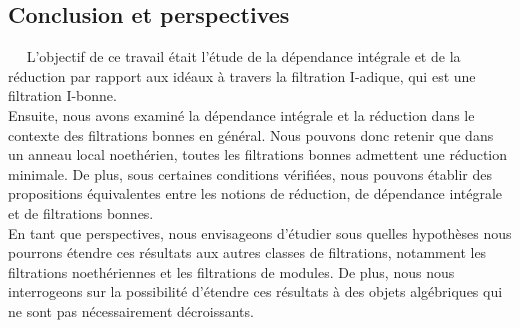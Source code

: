 \begin{center}
	\chapter*{Conclusion et perspectives}
\end{center}

$ \quad $ L’objectif de ce travail était l’étude de la dépendance intégrale et de la réduction par rapport aux idéaux à travers la filtration I-adique, qui est une filtration I-bonne. \\

Ensuite, nous avons examiné la dépendance intégrale et la réduction dans le contexte des filtrations bonnes en général. Nous pouvons donc retenir que dans un anneau local noethérien, toutes les filtrations bonnes admettent une réduction minimale. De plus, sous certaines conditions vérifiées, nous pouvons établir des propositions équivalentes entre les notions de réduction, de dépendance intégrale et de filtrations bonnes. \\

En tant que perspectives, nous envisageons d’étudier sous quelles hypothèses nous pourrons étendre ces résultats aux autres classes de filtrations, notamment les filtrations noethériennes et les filtrations de modules. De plus, nous nous interrogeons sur la possibilité d’étendre ces résultats à des objets algébriques qui ne sont pas nécessairement décroissants.


